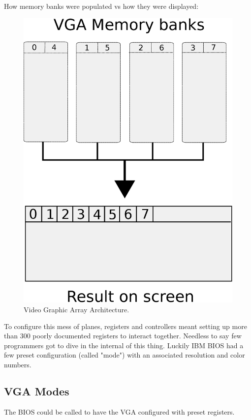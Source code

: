 \documentclass[book.tex]{subfiles}
\begin{document}
How memory banks were populated vs how they were displayed:
\begin{figure}[H]
\centering
\includegraphics[scale=0.5]{imgs/vga_ram_screen_layout.eps}
\caption{Video Graphic Array Architecture.}
\label{fig:vga_arch}
\end{figure}
 
\bigskip
To configure this mess of planes, registers and controllers meant setting up more than 300 poorly documented registers to interact together. Needless to say few programmers got to dive in the internal of this thing. Luckily IBM BIOS had a few preset configuration (called "mode") with an associated resolution and color numbers.

\subsection{VGA Modes}

The BIOS could be called to have the VGA configured with preset registers.
\end{document}
